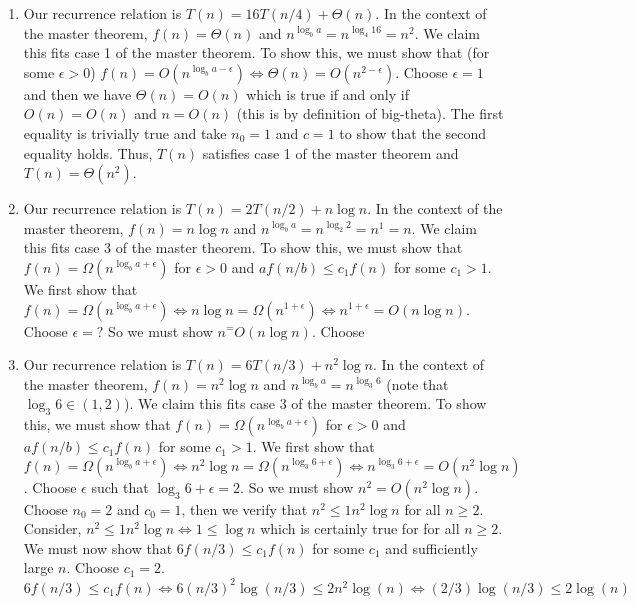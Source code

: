 \documentclass{article}
\begin{document}
\begin{enumerate}
    \item Our recurrence relation is $T(n) = 16T(n/4) + \Theta (n)$.
    In the context of the master theorem, $f(n) = \Theta (n)$ and $n^{\log_b a} = n^{\log_4 16} = n^2$.
    We claim this fits case 1 of the master theorem.
    To show this, we must show that (for some $\epsilon > 0$) $f(n) = O(n^{\log_b a - \epsilon}) \iff \Theta (n) = O(n^{2 - \epsilon})$. \parspace
    Choose $\epsilon = 1$ and then we have $\Theta (n) = O(n)$ which is true if and only if $O(n) = O(n)$ and $n = O(n)$ (this is by definition of big-theta).
    The first equality is trivially true and take $n_0 = 1$ and $c = 1$ to show that the second equality holds. \parspace
    Thus, $T(n)$ satisfies case 1 of the master theorem and $T(n) = \Theta (n^2)$.
    \item Our recurrence relation is $T(n) = 2T(n/2) + n \log n$.
    In the context of the master theorem, $f(n) = n \log n$ and $n^{\log_b a} = n^{\log_2 2} = n^1 = n$.
    We claim this fits case 3 of the master theorem.
    To show this, we must show that $f(n) = \Omega (n^{\log_b a + \epsilon})$ for $\epsilon > 0$ and $a f(n/b) \leq c_1 f(n)$ for some $c_1 > 1$. \parspace
    We first show that $f(n) = \Omega (n^{\log_b a + \epsilon}) \iff n \log n = \Omega (n^{1 + \epsilon}) \iff n^{1 + \epsilon} = O(n \log n)$.
    Choose $\epsilon = ?$
    So we must show $n^ = O(n \log n)$.
    Choose
    \item Our recurrence relation is $T(n) = 6T(n/3) + n^2 \log n$.
    In the context of the master theorem, $f(n) = n^2 \log n$ and $n^{\log_b a} = n^{\log_3 6}$ (note that $\log_3 6 \in (1,2)$).
    We claim this fits case 3 of the master theorem.
    To show this, we must show that $f(n) = \Omega (n^{\log_b a + \epsilon})$ for $\epsilon > 0$ and $a f(n/b) \leq c_1 f(n)$ for some $c_1 > 1$. \parspace
    We first show that $f(n) = \Omega (n^{\log_b a + \epsilon}) \iff n^2 \log n = \Omega (n^{\log_3 6 + \epsilon}) \iff n^{\log_3 6 + \epsilon} = O(n^2 \log n)$.
    Choose $\epsilon$ such that $\log_3 6 + \epsilon = 2$.
    So we must show $n^2 = O(n^2 \log n)$.
    Choose $n_0 = 2$ and $c_0 = 1$, then we verify that $n^2 \leq 1 n^2 \log n$ for all $n \geq 2$.
    Consider, $ n^2 \leq 1 n^2 \log n \iff 1 \leq \log n $ which is certainly true for for all $n \geq 2$. \parspace
    We must now show that $6 f(n/3) \leq c_1 f(n)$ for some $c_1$ and sufficiently large $n$.
    Choose $c_1 = 2$.
    $$ 6 f(n/3) \leq c_1 f(n) \iff 6 (n/3)^2 \log(n/3) \leq 2 n^2 \log(n) \iff (2/3) \log (n/3) \leq 2 \log (n) $$

\end{enumerate}
\end{document}
